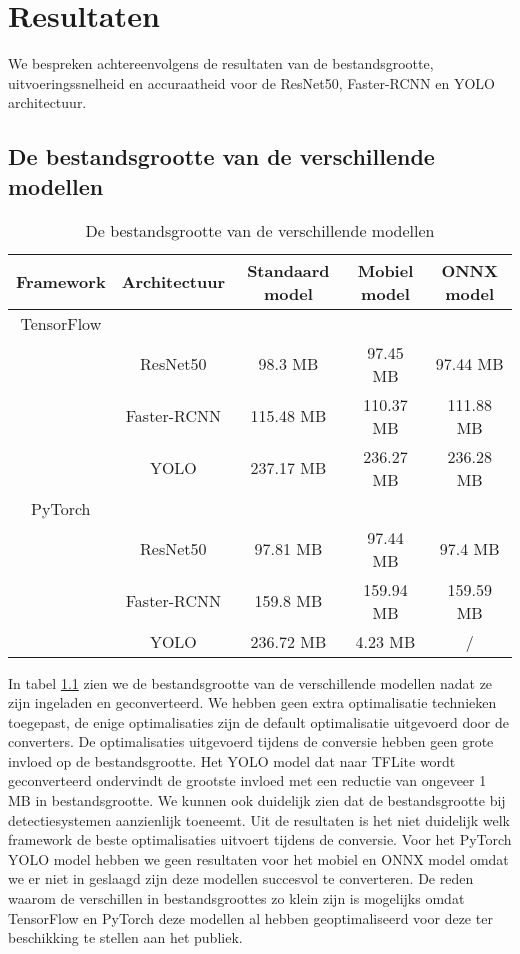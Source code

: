 \chapter{Resultaten}
We bespreken achtereenvolgens de resultaten van de bestandsgrootte, uitvoeringssnelheid en accuraatheid voor de ResNet50, Faster-RCNN en YOLO architectuur.

\section{De bestandsgrootte van de verschillende modellen} \label{res_size}

\begin{table}[!ht]
    \caption{De bestandsgrootte van de verschillende modellen}
\begin{tabular}{ccccc}
    \hline
    Framework & Architectuur & Standaard model & Mobiel model & ONNX model \\
    \hline
    TensorFlow & & & \\
     & ResNet50 & 98.3 MB & 97.45 MB & 97.44 MB \\
     & Faster-RCNN & 115.48 MB & 110.37 MB & 111.88 MB \\
     & YOLO & 237.17 MB & 236.27 MB & 236.28 MB \\
    PyTorch & & & \\
     & ResNet50 & 97.81 MB & 97.44 MB & 97.4 MB \\
     & Faster-RCNN & 159.8 MB & 159.94 MB & 159.59 MB \\
     & YOLO & 236.72 MB & 4.23 MB & / \\
    \hline
\end{tabular}
\label{tab:size}
\end{table}

In tabel \ref{tab:size} zien we de bestandsgrootte van de verschillende modellen nadat ze zijn ingeladen en geconverteerd.
We hebben geen extra optimalisatie technieken toegepast, de enige optimalisaties zijn de default optimalisatie uitgevoerd door de converters.
De optimalisaties uitgevoerd tijdens de conversie hebben geen grote invloed op de bestandsgrootte.
Het YOLO model dat naar TFLite wordt geconverteerd ondervindt de grootste invloed met een reductie van ongeveer 1 MB in bestandsgrootte.
We kunnen ook duidelijk zien dat de bestandsgrootte bij detectiesystemen aanzienlijk toeneemt.
Uit de resultaten is het niet duidelijk welk framework de beste optimalisaties uitvoert tijdens de conversie.
Voor het PyTorch YOLO model hebben we geen resultaten voor het mobiel en ONNX model omdat we er niet in geslaagd zijn deze modellen succesvol te converteren.
De reden waarom de verschillen in bestandsgroottes zo klein zijn is mogelijks omdat TensorFlow en PyTorch deze modellen al hebben geoptimaliseerd voor deze ter beschikking te stellen aan het publiek.

